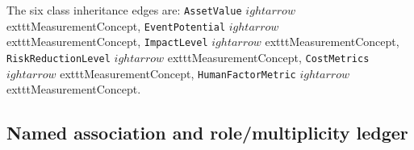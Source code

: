 The six class inheritance edges are: \texttt{Asset\allowbreak{}Value} $
ightarrow$ 	exttt{Measurement\allowbreak{}Concept}, \texttt{Event\allowbreak{}Potential} $
ightarrow$ 	exttt{Measurement\allowbreak{}Concept}, \texttt{Impact\allowbreak{}Level} $
ightarrow$ 	exttt{Measurement\allowbreak{}Concept}, \texttt{Risk\allowbreak{}Reduction\allowbreak{}Level} $
ightarrow$ 	exttt{Measurement\allowbreak{}Concept}, \texttt{Cost\allowbreak{}Metrics} $
ightarrow$ 	exttt{Measurement\allowbreak{}Concept}, \texttt{Human\allowbreak{}Factor\allowbreak{}Metric} $
ightarrow$ 	exttt{Measurement\allowbreak{}Concept}.
\subsection{Named association and role/multiplicity ledger}
\begingroup\footnotesize\setlength{\tabcolsep}{2pt}
